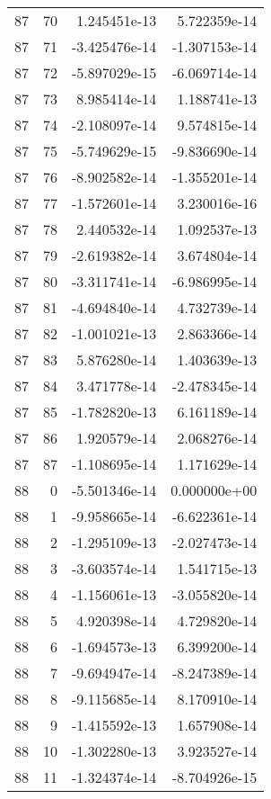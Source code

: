 \begin{tabular}{rrrr}
  87 &   70 &  1.245451e-13 &  5.722359e-14 \\
  87 &   71 & -3.425476e-14 & -1.307153e-14 \\
  87 &   72 & -5.897029e-15 & -6.069714e-14 \\
  87 &   73 &  8.985414e-14 &  1.188741e-13 \\
  87 &   74 & -2.108097e-14 &  9.574815e-14 \\
  87 &   75 & -5.749629e-15 & -9.836690e-14 \\
  87 &   76 & -8.902582e-14 & -1.355201e-14 \\
  87 &   77 & -1.572601e-14 &  3.230016e-16 \\
  87 &   78 &  2.440532e-14 &  1.092537e-13 \\
  87 &   79 & -2.619382e-14 &  3.674804e-14 \\
  87 &   80 & -3.311741e-14 & -6.986995e-14 \\
  87 &   81 & -4.694840e-14 &  4.732739e-14 \\
  87 &   82 & -1.001021e-13 &  2.863366e-14 \\
  87 &   83 &  5.876280e-14 &  1.403639e-13 \\
  87 &   84 &  3.471778e-14 & -2.478345e-14 \\
  87 &   85 & -1.782820e-13 &  6.161189e-14 \\
  87 &   86 &  1.920579e-14 &  2.068276e-14 \\
  87 &   87 & -1.108695e-14 &  1.171629e-14 \\
  88 &    0 & -5.501346e-14 &  0.000000e+00 \\
  88 &    1 & -9.958665e-14 & -6.622361e-14 \\
  88 &    2 & -1.295109e-13 & -2.027473e-14 \\
  88 &    3 & -3.603574e-14 &  1.541715e-13 \\
  88 &    4 & -1.156061e-13 & -3.055820e-14 \\
  88 &    5 &  4.920398e-14 &  4.729820e-14 \\
  88 &    6 & -1.694573e-13 &  6.399200e-14 \\
  88 &    7 & -9.694947e-14 & -8.247389e-14 \\
  88 &    8 & -9.115685e-14 &  8.170910e-14 \\
  88 &    9 & -1.415592e-13 &  1.657908e-14 \\
  88 &   10 & -1.302280e-13 &  3.923527e-14 \\
  88 &   11 & -1.324374e-14 & -8.704926e-15 \\

\end{tabular}
